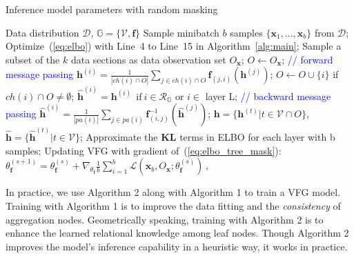 \documentclass[sigconf, anonymous, review]{acmart}
\theoremstyle{plain}
\theoremstyle{definition}
\theoremstyle{remark}
\begin{document}
\begin{algorithm}[H]
   \caption{Inference model parameters with random masking}
   \label{alg:rand_mask}
\begin{algorithmic}[1]
    Data distribution $\mathcal{D}$,  $\mathbb{G} = \{\mathcal{V}, \mathbf{f}\}$
   \STATE  Sample minibatch $b$ samples $\{\mathbf{x}_1, ..., \mathbf{x}_b \}$ from $\mathcal{D}$;
   \STATE  
    Optimize~(\ref{eq:elbo}) with Line~4 to Line~15 in Algorithm~\ref{alg:main};
    \STATE  Sample a subset of the $k$ data sections as data observation set $O_{\mathbf{x}}$; $O \leftarrow O_{\mathbf{x}}$;
    \STATE  \textcolor{blue}{// forward message passing}
   \STATE $\mathbf{h}^{(i)} = \frac{1}{|ch(i) \cap O |} \sum_{j \in ch(i) \cap O} \mathbf{f}_{(j,i)}(\mathbf{h}^{(j)})$; 
     \STATE  $O \leftarrow O \cup \{i\}$ if $ch(i) \cap O \neq \emptyset $; 
    \ENDFOR
    \STATE $\widehat{\mathbf{h}}^{(i)} = \mathbf{h}^{(i)} \ \  \text{if} \ i \in \mathcal{R}_{\mathbb{G}} $ or $i \in$ layer L;
   \STATE \textcolor{blue}{// backward message passing}
   \STATE $\widehat{\mathbf{h}}^{(i)} = \frac{1}{|pa(i)|} \sum_{j \in pa(i) } \mathbf{f}^{-1}_{ (i,j)}(\widehat{\mathbf{h}}^{(j)}) $;%
   \ENDFOR
    \STATE  $\mathbf{h} =  \{\mathbf{h}^{(t)} \big |  t \in \mathcal{V} \cap O \}$, $\widehat{\mathbf{h}} =  \{\widehat{\mathbf{h}}^{(t)} \big | t \in \mathcal{V} \}$;
    \STATE Approximate the $\mathbf{KL}$ terms in ELBO for each layer with b samples;
    \STATE Updating VFG with gradient of~(\ref{eq:elbo_tree_mask}): $\theta^{(s+1)}_{\mathbf{f}} = \theta^{(s)}_{\mathbf{f}} + \nabla_{\theta_{\mathbf{f}}}\frac{1}{b} \sum_{i=1}^b  \mathcal{L}(\mathbf{x}_b, O_{\mathbf{x}}; \theta^{(s)}_{\mathbf{f}})   \, ,$
   \ENDFOR
\end{algorithmic}%
\end{algorithm}



 In practice, we use Algorithm 2 along with Algorithm 1 to train a VFG model.   Training with Algorithm 1 is to improve the data fitting and the \emph{consistency} of aggregation nodes. Geometrically speaking, training with Algorithm 2 is to enhance the learned relational knowledge among leaf nodes.
 Though Algorithm 2 improves the model's inference capability in a heuristic way, it works in practice.
 
\end{document}
